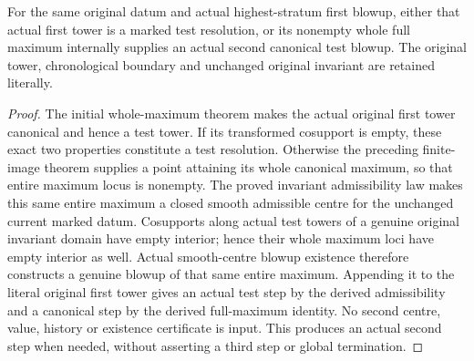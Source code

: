 \begin{theorem}
\label{hir:general-nc-actual-second-full-canonical-step}
\leanok
{}
For the same original datum and actual highest-stratum first blowup,
either that actual first tower is a marked test resolution, or its
nonempty whole full maximum internally supplies an actual second
canonical test blowup. The original tower, chronological boundary and
unchanged original invariant are retained literally.
\end{theorem}
\begin{proof}
The initial whole-maximum theorem makes the actual original first tower
canonical and hence a test tower. If its transformed cosupport is empty,
these exact two properties constitute a test resolution. Otherwise the
preceding finite-image theorem supplies a point attaining its whole
canonical maximum, so that entire maximum locus is nonempty. The proved
invariant admissibility law makes this same entire maximum a closed
smooth admissible centre for the unchanged current marked datum.
Cosupports along actual test towers of a genuine original invariant
domain have empty interior; hence their whole maximum loci have empty
interior as well. Actual smooth-centre blowup existence therefore
constructs a genuine blowup of that same entire maximum. Appending it
to the literal original first tower gives an actual test step by the
derived admissibility and a canonical step by the derived full-maximum
identity. No second centre, value, history or existence certificate is
input. This produces an actual second step when needed, without
asserting a third step or global termination.
\end{proof}
